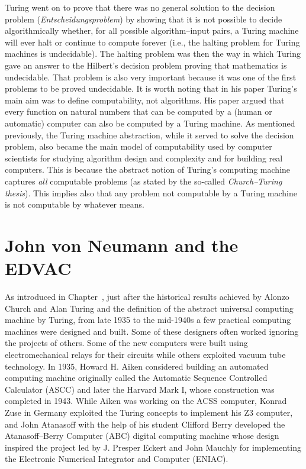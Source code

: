 \noindent Turing went on to prove that there was no general solution to the decision problem (\textit{Entscheidungsproblem}) by showing that it is not possible to decide algorithmically whether, for all possible algorithm--input pairs, a Turing machine will ever halt or continue to compute forever (i.e., the halting problem for Turing machines is undecidable). The halting problem was then the way in which Turing gave an answer to the Hilbert's decision problem proving that mathematics is undecidable. That problem is also very important because it was one of the first problems to be proved undecidable. It is worth noting that in his paper Turing's main aim was to define computability, not algorithms. His paper argued that every function on natural numbers that can be computed by a (human or automatic) computer can also be computed by a Turing machine. As mentioned previously, the Turing machine abstraction, while it served to solve the decision problem, also became the main model of computability used by computer scientists for studying algorithm design and complexity and for building real computers. This is because the abstract notion of Turing's computing machine captures \textit{all} computable \hbox{problems} (as stated by the so-called \textit{Church--Turing thesis}). This implies also that any problem not computable by a Turing machine is not computable by whatever means.

\section{\label{sec:2.2}John von Neumann and the EDVAC}

As introduced in Chapter~, just after the historical results achieved by Alonzo Church and Alan Turing and the definition of the abstract universal computing machine by Turing, from late 1935 to the mid-1940s a few practical computing machines were designed and built. Some of these designers often worked ignoring the projects of others. Some of the new computers were built using electromechanical relays for their circuits while others exploited vacuum tube technology. In 1935, Howard H. Aiken considered building an automated computing machine originally called the Automatic Sequence Controlled Calculator (ASCC) and later the Harvard Mark I, whose construction was completed in 1943. While Aiken was working on the ACSS computer, Konrad Zuse in Germany exploited the Turing concepts to implement his Z3 computer, and John Atanasoff with the help of his student Clifford Berry developed the Atanasoff--Berry Computer (ABC) digital computing machine whose design inspired the project led by J. Presper Eckert and John Mauchly for implementing the Electronic Numerical Integrator and Computer (ENIAC).

